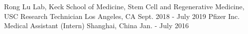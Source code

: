 

\begin{cventries}

 \cventry
    {Rong Lu Lab, Keck School of Medicine, Stem Cell and Regenerative Medicine, USC} %
    {Research Technician} %
    {Los Angeles, CA} %
    {Sept. 2018 - July 2019} %
    {}
 \cventry
    {Pfizer Inc.}
    {Medical Assistant (Intern)}
    {Shanghai, China}
    {Jan. - July 2016}
    {}
\end{cventries}
